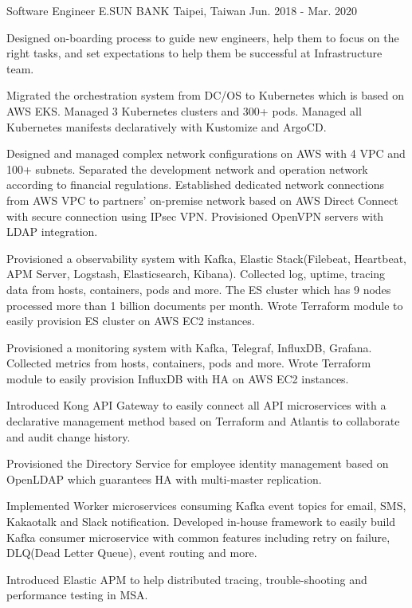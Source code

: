 \begin{cventries}
  \cventry
    {Software Engineer} %
    {E.SUN BANK} %
    {Taipei, Taiwan} %
    {Jun. 2018 - Mar. 2020} %
    {
      \begin{cvitems} %
        \item {Designed on-boarding process to guide new engineers, help them to focus on the right tasks, and set expectations to help them be successful at Infrastructure team.}
        \item {Migrated the orchestration system from DC/OS to Kubernetes which is based on AWS EKS. Managed 3 Kubernetes clusters and 300+ pods. Managed all Kubernetes manifests declaratively with Kustomize and ArgoCD.}
        \item {Designed and managed complex network configurations on AWS with 4 VPC and 100+ subnets. Separated the development network and operation network according to financial regulations. Established dedicated network connections from AWS VPC to partners' on-premise network based on AWS Direct Connect with secure connection using IPsec VPN. Provisioned OpenVPN servers with LDAP integration.}
        \item {Provisioned a observability system with Kafka, Elastic Stack(Filebeat, Heartbeat, APM Server, Logstash, Elasticsearch, Kibana). Collected log, uptime, tracing data from hosts, containers, pods and more. The ES cluster which has 9 nodes processed more than 1 billion documents per month. Wrote Terraform module to easily provision ES cluster on AWS EC2 instances.}
        \item {Provisioned a monitoring system with Kafka, Telegraf, InfluxDB, Grafana. Collected metrics from hosts, containers, pods and more. Wrote Terraform module to easily provision InfluxDB with HA on AWS EC2 instances.}
        \item {Introduced Kong API Gateway to easily connect all API microservices with a declarative management method based on Terraform and Atlantis to collaborate and audit change history.}
        \item {Provisioned the Directory Service for employee identity management based on OpenLDAP which guarantees HA with multi-master replication.}
        \item {Implemented Worker microservices consuming Kafka event topics for email, SMS, Kakaotalk and Slack notification. Developed in-house framework to easily build Kafka consumer microservice with common features including retry on failure, DLQ(Dead Letter Queue), event routing and more.}
        \item {Introduced Elastic APM to help distributed tracing, trouble-shooting and performance testing in MSA.}
      \end{cvitems}
    }


\end{cventries}
